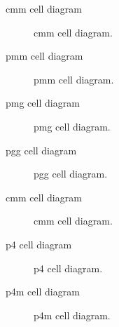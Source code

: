 \documentclass{beamer}
\theoremstyle{definition}
\begin{document}
\begin{frame}{cmm cell diagram}
    \begin{figure}
        \centering
        
        \caption{cmm cell diagram.}
        \label{fig:enter-label}
    \end{figure}
\end{frame}
\begin{frame}{pmm cell diagram}
    \begin{figure}
        \centering
        
        \caption{pmm cell diagram.}
        \label{fig:enter-label}
    \end{figure}
\end{frame}
\begin{frame}{pmg cell diagram}
    \begin{figure}
        \centering
        
        \caption{pmg cell diagram.}
        \label{fig:enter-label}
    \end{figure}
\end{frame}
\begin{frame}{pgg cell diagram}
    \begin{figure}
        \centering
        
        \caption{pgg cell diagram.}
        \label{fig:enter-label}
    \end{figure}
\end{frame}
\begin{frame}{cmm cell diagram}
    \begin{figure}
        \centering
        
        \caption{cmm cell diagram.}
        \label{fig:enter-label}
    \end{figure}
\end{frame}
\begin{frame}{p4 cell diagram}
    \begin{figure}
        \centering
        
        \caption{p4 cell diagram.}
        \label{fig:enter-label}
    \end{figure}
\end{frame}
\begin{frame}{p4m cell diagram}
    \begin{figure}
        \centering
        
        \caption{p4m cell diagram.}
        \label{fig:enter-label}
    \end{figure}
\end{frame}
\end{document}
